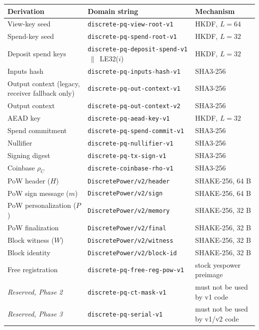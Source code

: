 \documentclass[11pt,a4paper]{article}
\newcommand{\code}[1]{\texttt{\small #1}}
\newcommand{\concat}{\,\|\,}
\begin{document}
\begin{table}[htbp]
\centering
\footnotesize
\begin{tabularx}{\textwidth}{@{}lXl@{}}
\toprule
\textbf{Derivation} & \textbf{Domain string} & \textbf{Mechanism} \\
\midrule
View-key seed & \code{discrete-pq-view-root-v1} & HKDF, $L{=}64$ \\
Spend-key seed & \code{discrete-pq-spend-root-v1} & HKDF, $L{=}32$ \\
Deposit spend keys & \code{discrete-pq-deposit-spend-v1} $\concat$ LE32($i$) & HKDF, $L{=}32$ \\
Inputs hash & \code{discrete-pq-inputs-hash-v1} & SHA3-256 \\
Output context (legacy, receiver fallback only) & \code{discrete-pq-out-context-v1} & SHA3-256 \\
Output context & \code{discrete-pq-out-context-v2} & SHA3-256 \\
AEAD key & \code{discrete-pq-aead-key-v1} & HKDF, $L{=}32$ \\
Spend commitment & \code{discrete-pq-spend-commit-v1} & SHA3-256 \\
Nullifier & \code{discrete-pq-nullifier-v1} & SHA3-256 \\
Signing digest & \code{discrete-pq-tx-sign-v1} & SHA3-256 \\
Coinbase $\rho_C$ & \code{discrete-coinbase-rho-v1} & SHA3-256 \\
PoW header ($H$) & \code{DiscretePower/v2/header} & SHAKE-256, 64 B \\
PoW sign message ($m$) & \code{DiscretePower/v2/sign} & SHAKE-256, 64 B \\
PoW personalization ($P$) & \code{DiscretePower/v2/memory} & SHAKE-256, 32 B \\
PoW finalization & \code{DiscretePower/v2/final} & SHAKE-256, 32 B \\
Block witness ($W$) & \code{DiscretePower/v2/witness} & SHAKE-256, 32 B \\
Block identity & \code{DiscretePower/v2/block-id} & SHAKE-256, 32 B \\
Free registration & \code{discrete-pq-free-reg-pow-v1} & stock yespower preimage \\
\midrule
\emph{Reserved, Phase 2} & \code{discrete-pq-ct-mask-v1} & must not be used by v1 code \\
\emph{Reserved, Phase 3} & \code{discrete-pq-serial-v1} & must not be used by v1/v2 code \\
\bottomrule
\end{tabularx}
\end{table}
\end{document}
